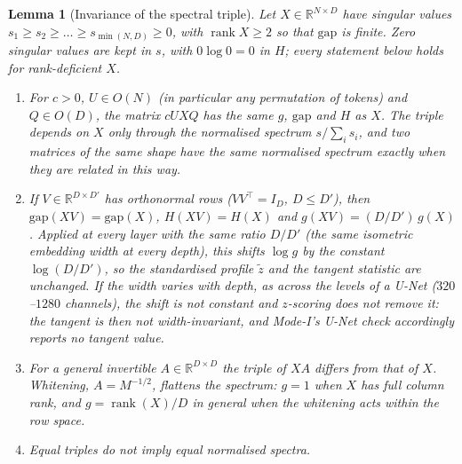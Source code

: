 \documentclass[11pt]{article}
\newtheorem{lemma}[theorem]{Lemma}
\theoremstyle{definition}
\newcommand{\R}{\mathbb{R}}
\newcommand{\gap}{\mathrm{gap}}
\begin{document}
\begin{lemma}[Invariance of the spectral triple]\label{lem:rot}
Let $X\in\R^{N\times D}$ have singular values $s_1\ge s_2\ge\dots\ge s_{\min(N,D)}\ge0$, with $\operatorname{rank}X\ge2$ so that $\gap$ is finite. Zero singular values are kept in $s$, with $0\log0=0$ in $H$; every statement below holds for rank-deficient $X$.
\begin{enumerate}
 \item[(i)] For $c>0$, $U\in O(N)$ (in particular any permutation of tokens) and $Q\in O(D)$, the matrix $cUXQ$ has the same $g$, $\gap$ and $H$ as $X$. The triple depends on $X$ only through the normalised spectrum $s/\sum_i s_i$, and two matrices of the same shape have the same normalised spectrum exactly when they are related in this way.
 \item[(ii)] If $V\in\R^{D\times D'}$ has orthonormal rows ($VV^\top=I_D$, $D\le D'$), then $\gap(XV)=\gap(X)$, $H(XV)=H(X)$ and $g(XV)=(D/D')\,g(X)$. Applied at every layer with the same ratio $D/D'$ (the same isometric embedding width at every depth), this shifts $\log g$ by the constant $\log(D/D')$, so the standardised profile $\tilde z$ and the tangent statistic are unchanged. If the width varies with depth, as across the levels of a U-Net ($320$--$1280$ channels), the shift is not constant and $z$-scoring does not remove it: the tangent is then not width-invariant, and Mode-I's U-Net check accordingly reports no tangent value.
 \item[(iii)] For a general invertible $A\in\R^{D\times D}$ the triple of $XA$ differs from that of $X$. Whitening, $A=M^{-1/2}$, flattens the spectrum: $g=1$ when $X$ has full column rank, and $g=\operatorname{rank}(X)/D$ in general when the whitening acts within the row space.
 \item[(iv)] Equal triples do not imply equal normalised spectra.
\end{enumerate}
\end{lemma}
\end{document}
